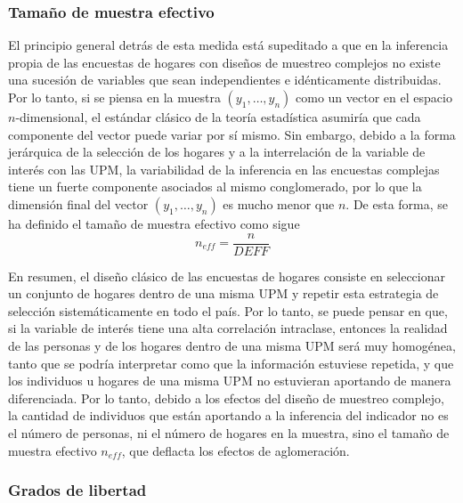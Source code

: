 \documentclass[
  10pt,
  spanish,
]{book}
\begin{document}
\hypertarget{tamauxf1o-de-muestra-efectivo}{%
\subsubsection*{Tamaño de muestra efectivo}\label{tamauxf1o-de-muestra-efectivo}}

El principio general detrás de esta medida está supeditado a que en la inferencia propia de las encuestas de hogares con diseños de muestreo complejos no existe una sucesión de variables que sean independientes e idénticamente distribuidas. Por lo tanto, si se piensa en la muestra \((y_1, \ldots, y_n)\) como un vector en el espacio \(n\)-dimensional, el estándar clásico de la teoría estadística asumiría que cada componente del vector puede variar por sí mismo. Sin embargo, debido a la forma jerárquica de la selección de los hogares y a la interrelación de la variable de interés con las UPM, la variabilidad de la inferencia en las encuestas complejas tiene un fuerte componente asociados al mismo conglomerado, por lo que la dimensión final del vector \((y_1, \ldots, y_n)\) es mucho menor que \(n\). De esta forma, se ha definido el tamaño de muestra efectivo \citep[capítulo 6]{United_Nations_2005} como sigue
\[
n_{eff} = \frac{n}{DEFF}
\]

En resumen, el diseño clásico de las encuestas de hogares consiste en seleccionar un conjunto de hogares dentro de una misma UPM y repetir esta estrategia de selección sistemáticamente en todo el país. Por lo tanto, se puede pensar en que, si la variable de interés tiene una alta correlación intraclase, entonces la realidad de las personas y de los hogares dentro de una misma UPM será muy homogénea, tanto que se podría interpretar como que la información estuviese repetida, y que los individuos u hogares de una misma UPM no estuvieran aportando de manera diferenciada. Por lo tanto, debido a los efectos del diseño de muestreo complejo, la cantidad de individuos que están aportando a la inferencia del indicador no es el número de personas, ni el número de hogares en la muestra, sino el tamaño de muestra efectivo \(n_{eff}\), que deflacta los efectos de aglomeración.

\hypertarget{grados-de-libertad}{%
\subsubsection*{Grados de libertad}\label{grados-de-libertad}}
\end{document}
